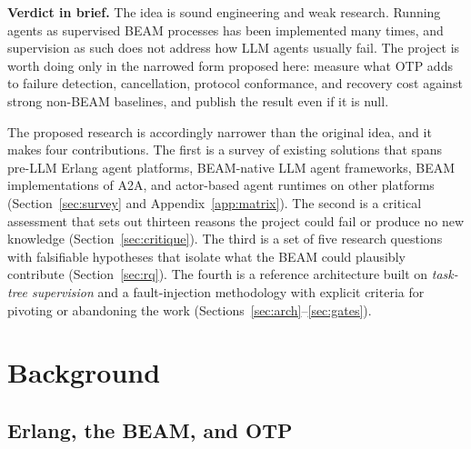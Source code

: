\documentclass[conference,letterpaper]{IEEEtran}
\begin{document}
\begin{tcolorbox}[colback=gray!6,colframe=gray!55,boxrule=0.5pt,arc=1pt,
  left=4pt,right=4pt,top=3pt,bottom=3pt,fontupper=\small]
\textbf{Verdict in brief.} The idea is sound engineering and weak research.
Running agents as supervised BEAM processes has been implemented many times,
and supervision as such does not address how LLM agents usually fail. The
project is worth doing only in the narrowed form proposed here: measure what
OTP adds to failure detection, cancellation, protocol conformance, and
recovery cost against strong non-BEAM baselines, and publish the result even
if it is null.
\end{tcolorbox}

The proposed research is accordingly narrower than the original idea, and it
makes four contributions. The first is a survey of existing solutions that
spans pre-LLM Erlang agent platforms, BEAM-native LLM agent frameworks, BEAM
implementations of A2A, and actor-based agent runtimes on other platforms
(Section~\ref{sec:survey} and Appendix~\ref{app:matrix}). The second is a
critical assessment that sets out thirteen reasons the project could fail or
produce no new knowledge (Section~\ref{sec:critique}). The third is a set of
five research questions with falsifiable hypotheses that isolate what the
BEAM could plausibly contribute (Section~\ref{sec:rq}). The fourth is a
reference architecture built on \emph{task-tree supervision} and a
fault-injection methodology with explicit criteria for pivoting or
abandoning the work
(Sections~\ref{sec:arch}--\ref{sec:gates}).

\section{Background}\label{sec:background}

\subsection{Erlang, the BEAM, and OTP}
\end{document}
